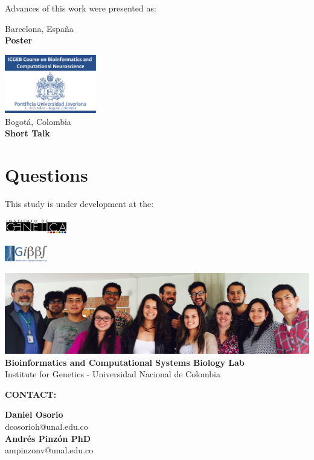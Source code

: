 \documentclass[11pt]{beamer}
\begin{document}
\begin{frame}{Advances of this work were presented as:}
\begin{multicols}{3}
\begin{center}
Barcelona, España\\
\textbf{Poster}
\end{center}
\begin{center}
\includegraphics[width=0.3\textwidth]{ICGEB}\\
Bogotá, Colombia\\
\textbf{Short Talk}
\end{center}
\end{multicols}
\end{frame}
\section{Questions}
\begin{frame}{This study is under development at the:}
\begin{multicols}{2}
\includegraphics[height=0.7cm]{logoIG}
\begin{flushright}
\includegraphics[height=0.7cm]{logoGIBBS}
\end{flushright}
\end{multicols}
\begin{center}
\includegraphics[width=\textwidth]{GIBBS}\\
\textbf{Bioinformatics and Computational Systems Biology Lab}\\
Institute for Genetics - Universidad Nacional de Colombia
\end{center}
\begin{center}
\textbf{CONTACT:}
\begin{multicols}{2}
\begin{center}
\textbf{Daniel Osorio}\\
dcosorioh@unal.edu.co\\
\textbf{Andrés Pinzón PhD}\\
ampinzonv@unal.edu.co
\end{center}
\end{multicols}
\end{center}
\end{frame}
\end{document}
